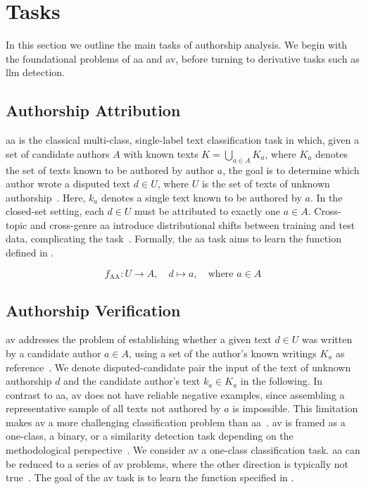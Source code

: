 \section{Tasks}
\label{sec:tasks}

In this section we outline the main tasks of authorship analysis. 
We begin with the foundational problems of \ac{aa} and \ac{av}, before turning to derivative tasks such as \ac{llm} detection.

\subsection{Authorship Attribution}
\ac{aa} is the classical multi-class, single-label text classification task in which, given a set of candidate authors $A$ with known texts $K=\bigcup_{a\in A} K_a$, where $K_a$ denotes the set of texts known to be authored by author $a$, the goal is to determine which author wrote a disputed text $d \in U$, where $U$ is the set of texts of unknown authorship~\citep{koppel_authorship_2004,barlas_cross_domain_2020}. 
Here, $k_a$ denotes a single text known to be authored by $a$.
In the closed-set setting, each $d \in U$ must be attributed to exactly one $a \in A$. 
Cross-topic and cross-genre \ac{aa} introduce distributional shifts between training and test data, complicating the task~\citep{barlas_cross_domain_2020}.
Formally, the \ac{aa} task aims to learn the function defined in .

\begin{equation}
f_{\text{AA}} : U \to A, \quad d \mapsto a, \quad \text{where } a \in A
\label{eq:authorship_attribution_function}
\end{equation}


\subsection{Authorship Verification}
\ac{av} addresses the problem of establishing whether a given text $d \in U$ was written by a candidate author $a \in A$, using a set of the author’s known writings $K_a$ as reference~\citep{koppel_authorship_2004}.
We denote disputed-candidate pair the input of the text of unknown authorship $d$ and the candidate author's text $k_a \in K_a$ in the following.
In contrast to \ac{aa}, \ac{av} does not have reliable negative examples, since assembling a representative sample of all texts not authored by 
$a$ is impossible. 
This limitation makes \ac{av} a more challenging classification problem than \ac{aa}~\citep{llm_detection_av_2025,neal_surveying_2018,koppel_authorship_2004}.
\ac{av} is framed as a one-class, a binary, or a similarity detection task depending on the methodological perspective~\citep{neal_surveying_2018,koppel_authorship_2004}.  
We consider \ac{av} a one-class classification task.
\ac{aa} can be reduced to a series of \ac{av} problems, where the other direction is typically not true~\citep{barlas_cross_domain_2020,tyo_state_2022}.
The goal of the \ac{av} task is to learn the function specified in .

